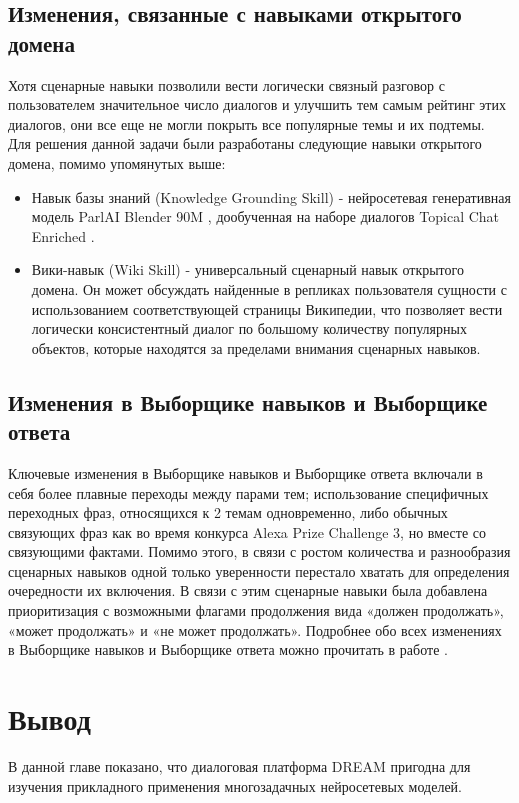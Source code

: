 \subsection{Изменения, связанные с навыками открытого домена}

Хотя сценарные навыки позволили вести логически связный разговор с пользователем значительное число диалогов и улучшить тем самым рейтинг этих диалогов, они все еще не могли покрыть все популярные темы и их подтемы. Для решения данной задачи были разработаны следующие навыки открытого домена, помимо упомянутых выше:
\begin{itemize}
\item Навык базы знаний (Knowledge Grounding Skill) - нейросетевая генеративная модель ParlAI Blender 90M \cite{roller_other_2020}, дообученная на наборе диалогов Topical Chat Enriched \cite{hedayatnia_2020}.
\item Вики-навык (Wiki Skill) - универсальный сценарный навык открытого домена. Он может обсуждать найденные в репликах пользователя сущности с использованием соответствующей страницы Википедии, что позволяет вести логически консистентный диалог по большому количеству популярных объектов, которые находятся за пределами внимания сценарных навыков.
\end{itemize}
\subsection{Изменения в Выборщике навыков и Выборщике ответа}

Ключевые изменения в Выборщике навыков и Выборщике ответа включали в себя более плавные переходы между парами тем; использование специфичных переходных фраз, относящихся к 2 темам одновременно, либо обычных связующих фраз как во время конкурса Alexa Prize Challenge 3, но вместе со связующими фактами.
Помимо этого, в связи с ростом количества и разнообразия сценарных навыков одной только уверенности перестало хватать для определения очередности их включения. В связи с этим сценарные навыки была добавлена приоритизация с возможными флагами продолжения вида «должен продолжать», «может продолжать» и «не может продолжать».
Подробнее обо всех изменениях в Выборщике навыков и Выборщике ответа можно прочитать в работе \cite{dream2}.

\section{Вывод}

В данной главе показано, что {диалоговая платформа DREAM пригодна для изучения прикладного применения многозадачных нейросетевых моделей.}